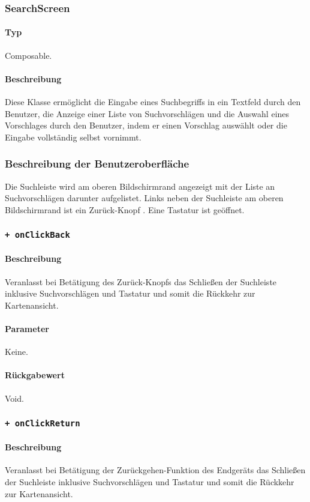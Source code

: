 \subsubsection{SearchScreen}
\paragraph*{Typ}
Composable.
\paragraph*{Beschreibung}
Diese Klasse ermöglicht die Eingabe eines Suchbegriffs in ein Textfeld durch den Benutzer, 
die Anzeige einer Liste von Suchvorschlägen und die Auswahl eines Vorschlages durch den Benutzer, 
indem er einen Vorschlag auswählt oder die Eingabe vollständig selbst vornimmt.

\subsubsection*{Beschreibung der Benutzeroberfläche}
Die Suchleiste wird am oberen Bildschirmrand angezeigt mit der Liste an Suchvorschlägen darunter aufgelistet.
Links neben der Suchleiste am oberen Bildschirmrand ist ein \dq Zurück-Knopf \dq{}.
Eine Tastatur ist geöffnet.

\subsubsection*{\texttt{+ onClickBack}}%
\paragraph*{Beschreibung}
Veranlasst bei Betätigung des \dq Zurück-Knopfs \dq{} das Schließen der Suchleiste inklusive Suchvorschlägen und Tastatur und somit die Rückkehr zur Kartenansicht.
\paragraph*{Parameter}
Keine.
\paragraph*{Rückgabewert}
Void.

\subsubsection*{\texttt{+ onClickReturn}}%
\paragraph*{Beschreibung}
Veranlasst bei Betätigung der Zurückgehen-Funktion des Endgeräts das Schließen der Suchleiste inklusive Suchvorschlägen und Tastatur und somit die Rückkehr zur Kartenansicht.
